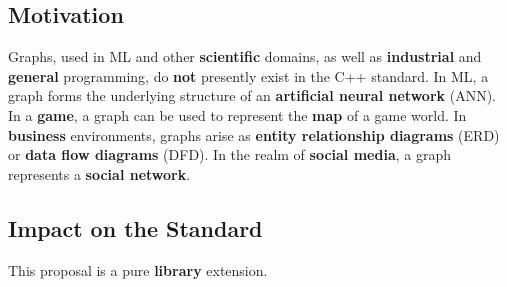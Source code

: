 \documentclass[10pt,onecolumn]{article}
\begin{document}
\subsection{Motivation}
Graphs, used in ML and other \textbf{scientific} domains, as well as \textbf{industrial} and \textbf{general} programming, do \textbf{not} presently exist in the C++ standard. In ML, a graph forms the underlying structure of an \textbf{artificial neural network} (ANN). In a \textbf{game}, a graph can be used to
represent the \textbf{map} of a game world. In \textbf{business} environments, graphs arise as \textbf{entity relationship diagrams} (ERD) or \textbf{data flow diagrams} (DFD). In the realm of \textbf{social media}, a graph represents a \textbf{social network}.

\subsection{Impact on the Standard}
This proposal is a pure \textbf{library} extension.
\end{document}
